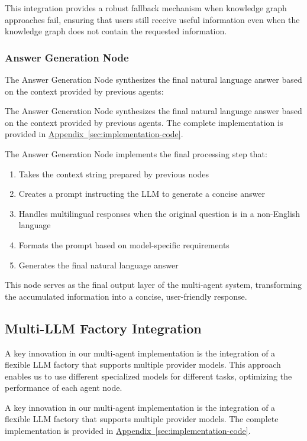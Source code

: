 This integration provides a robust fallback mechanism when knowledge graph approaches fail, ensuring that users still receive useful information even when the knowledge graph does not contain the requested information.

\subsubsection{Answer Generation Node}
The Answer Generation Node synthesizes the final natural language answer based on the context provided by previous agents:

The Answer Generation Node synthesizes the final natural language answer based on the context provided by previous agents. The complete implementation is provided in \hyperref[code:answer-generation-node]{Appendix~\ref{sec:implementation-code}}.

The Answer Generation Node implements the final processing step that:
\begin{enumerate}
    \item Takes the context string prepared by previous nodes
    \item Creates a prompt instructing the LLM to generate a concise answer
    \item Handles multilingual responses when the original question is in a non-English language
    \item Formats the prompt based on model-specific requirements
    \item Generates the final natural language answer
\end{enumerate}

This node serves as the final output layer of the multi-agent system, transforming the accumulated information into a concise, user-friendly response.

\subsection{Multi-LLM Factory Integration}
A key innovation in our multi-agent implementation is the integration of a flexible LLM factory that supports multiple provider models. This approach enables us to use different specialized models for different tasks, optimizing the performance of each agent node.

A key innovation in our multi-agent implementation is the integration of a flexible LLM factory that supports multiple provider models. The complete implementation is provided in \hyperref[code:llm-factory-integration]{Appendix~\ref{sec:implementation-code}}.

